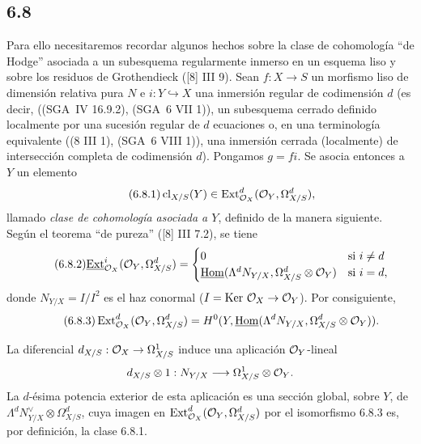 \subsection*{6.8}
Para ello necesitaremos recordar algunos hechos sobre la clase de cohomología ``de Hodge'' asociada a un subesquema regularmente inmerso en un esquema liso y sobre los residuos de Grothendieck ([8] III 9). Sean $f:X\to S$ un morfismo liso de dimensión relativa pura $N$ e $i:Y\hookrightarrow X$ una inmersión regular de codimensión $d$ (es decir, ((SGA~IV 16.9.2), (SGA~6 VII 1)), un subesquema cerrado definido localmente por una sucesión regular de $d$ ecuaciones o, en una terminología equivalente ((8 III 1), (SGA~6 VIII 1)), una inmersión cerrada (localmente) de intersección completa de codimensión $d$). Pongamos $g=fi$. Se asocia entonces a $Y$ un elemento
\begin{equation}
\tag{6.8.1}
\operatorname{cl}_{X/S}(Y)\in\operatorname{Ext}^d_{\mathcal{O}_X}(\mathcal{O}_Y,\Omega^d_{X/S}),
\end{equation}
llamado \emph{clase de cohomología asociada a $Y$}, definido de la manera siguiente. Según el teorema ``de pureza'' ([8] III 7.2), se tiene
\begin{equation}
\tag{6.8.2}
\underline{\operatorname{Ext}}^i_{\mathcal{O}_X}(\mathcal{O}_Y,\Omega^d_{X/S})=
\begin{cases}
0& \text{si } i\ne d\\
\underline{\operatorname{Hom}}(\Lambda^d N_{Y/X},\Omega^d_{X/S}\otimes\mathcal{O}_Y)& \text{si } i=d,
\end{cases}
\end{equation}
donde $N_{Y/X}=I/I^2$ es el haz conormal ($I=\operatorname{Ker}\,\mathcal{O}_X\to\mathcal{O}_Y$). Por consiguiente,
\begin{equation}
\tag{6.8.3}
\operatorname{Ext}^d_{\mathcal{O}_X}(\mathcal{O}_Y,\Omega^d_{X/S})=H^0(Y,\underline{\operatorname{Hom}}(\Lambda^dN_{Y/X},\Omega^d_{X/S}\otimes\mathcal{O}_Y)).
\end{equation}

La diferencial $d_{X/S}:\mathcal{O}_X\to\Omega^1_{X/S}$ induce una aplicación $\mathcal{O}_Y$-lineal
\[
d_{X/S}\otimes 1:N_{Y/X}\longrightarrow \Omega^1_{X/S}\otimes\mathcal{O}_Y.
\]
La $d$-ésima potencia exterior de esta aplicación es una sección global, sobre $Y$, de $\Lambda^d N_{Y/X}^{\vee}\otimes\Omega^d_{X/S}$, cuya imagen en $\operatorname{Ext}^d_{\mathcal{O}_X}(\mathcal{O}_Y,\Omega^d_{X/S})$ por el isomorfismo 6.8.3 es, por definición, la clase 6.8.1.

